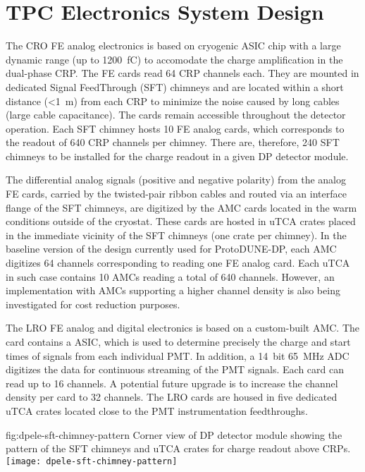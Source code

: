 \section{TPC Electronics System Design}
\label{sec:fddp-tpc-elec-design}

The CRO FE analog electronics is based on cryogenic ASIC chip with a large dynamic range (up to \SI{1200}{\femto\coulomb}) to accomodate the charge amplification in the dual-phase CRP. The FE cards read \num{64} CRP channels each. They are mounted in dedicated Signal FeedThrough (SFT) chimneys and are located within a short distance (\SI{<1}{\metre}) from each CRP to minimize the noise caused by long cables (large cable capacitance). The cards remain accessible throughout the detector operation. Each SFT chimney hosts \num{10} FE analog cards, which corresponds to the readout of \num{640} CRP channels per chimney. There are, therefore, \num{240} SFT chimneys to be installed for the charge readout in a given DP detector module.   

The differential analog signals (positive and negative polarity) from the analog FE cards, carried by the twisted-pair ribbon cables and routed via an interface flange of the SFT chimneys, are digitized by the AMC cards located in the warm conditions outside of the cryostat. These cards are hosted in uTCA crates placed in the immediate vicinity of the SFT chimneys (one crate per chimney). In the baseline version of the design currently used for ProtoDUNE-DP, each AMC digitizes \num{64} channels corresponding to reading one FE analog card. Each uTCA in such case contains \num{10} AMCs reading a total of \num{640} channels. However, an implementation with AMCs supporting a higher channel density is also being investigated for cost reduction purposes.

The LRO FE analog and digital electronics is based on a custom-built AMC. The card contains a  ASIC, which is used to determine precisely the charge and start times of signals from each individual PMT. In addition, a \SI{14}{bit} \SI{65}{MHz} ADC digitizes the data for continuous streaming of the PMT signals. Each card can read up to \num{16} channels. A potential future upgrade is to increase the channel density per card to \num{32} channels. The LRO cards are housed in five dedicated uTCA crates located close to the PMT instrumentation feedthroughs.

\begin{dunefigure}{fig:dpele-sft-chimney-pattern}
{Corner view of DP detector module showing the pattern of the SFT chimneys and uTCA crates for charge readout above CRPs.}
\texttt{[image: dpele-sft-chimney-pattern]}
\end{dunefigure}

